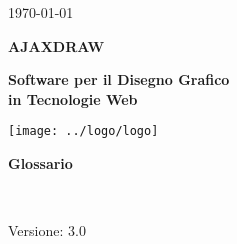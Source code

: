 
\title{\TITOLODOC}
\author{Mirco Geremia}



\renewcommand{\insertversion}{3.0} %
\renewcommand{\TITOLODOC}{Glossario} %
\renewcommand{\glosspath}{.\glossario} %

\begin{titlepage}
\begin{center}
	\begin{Large}	\today \end{Large}
\end{center}

\vspace{20pt}

\begin{center}
	\begin{Huge}
				\textbf{AJAXDRAW}
	\end{Huge}
\end{center}			

\begin{center}
	\begin{large}
				\textbf{Software per il Disegno Grafico\\ in Tecnologie Web}
	\end{large}
\end{center}			

\vspace{20pt}

\begin{center}
\texttt{[image: ../logo/logo]}
\end{center}

\vspace{170pt}
\begin{center} %
	\begin{Huge}
				\textbf{\TITOLODOC}
	\end{Huge}
			\\
\end{center}
\vspace{200pt}
\begin{center}
Versione: \insertversion
\end{center}
\end{titlepage}

